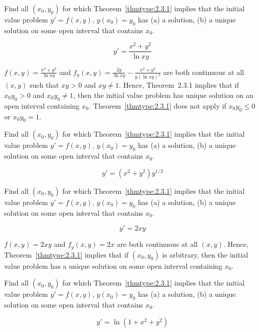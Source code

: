 \documentclass{ximera}
\begin{document}
\begin{problem}\label{exer:2.3.4} Find all $(x_0,y_0)$ for
which Theorem~\ref{thmtype:2.3.1}
implies that the initial value problem $y'=f(x,y),\,  y(x_0)=y_0$ has
(a) a solution, (b) a  unique solution on some open interval that contains $x_0$.

$$y'=\frac{x^2+y^2}{\ln xy}$$ 



\begin{solution}
    $f(x,y)=\frac{x^2+y^2}{\ln xy}$ and $f_y(x,y)=\frac{2y}{\ln
xy}-\frac{x^2+y^2}{ y(\ln xy)^2}$ are both continuous at all $(x,y)$
such that $xy>0$ and $xy\ne1$. Hence,  Theorem~2.3.1 implies
that if
$x_0y_0>0$ and $x_0y_0\ne1$, then the
initial value problem has unique solution on an open interval
containing $x_0$.   Theorem~\ref{thmtype:2.3.1} does not apply
if $x_0y_0\le0$ or $x_0y_0=1$.
\end{solution}
\end{problem}

\begin{problem}\label{exer:2.3.5} Find all $(x_0,y_0)$ for
which Theorem~\ref{thmtype:2.3.1}
implies that the initial value problem $y'=f(x,y),\,  y(x_0)=y_0$ has
(a) a solution, (b) a  unique solution on some open interval that contains $x_0$.

$$y'=(x^2+y^2)y^{1/3}$$ 
\end{problem}

\begin{problem}\label{exer:2.3.6} Find all $(x_0,y_0)$ for
which Theorem~\ref{thmtype:2.3.1}
implies that the initial value problem $y'=f(x,y),\,  y(x_0)=y_0$ has
(a) a solution, (b) a  unique solution on some open interval that contains $x_0$.

$$y'=2xy$$ 



\begin{solution}
    $f(x,y)=2xy$ and $f_y(x,y)=2x$ are both continuous at all $(x,y)$.
Hence,  Theorem~\ref{thmtype:2.3.1} implies that if $(x_0,y_0)$
is arbitrary, then the initial value problem
has a  unique solution on some open interval containing  $x_0$.
\end{solution}
\end{problem}

\begin{problem}\label{exer:2.3.7} Find all $(x_0,y_0)$ for
which Theorem~\ref{thmtype:2.3.1}
implies that the initial value problem $y'=f(x,y),\,  y(x_0)=y_0$ has
(a) a solution, (b) a  unique solution on some open interval that contains $x_0$.

$$y'=\ln(1+x^2+y^2)$$
\end{problem}
\end{document}
